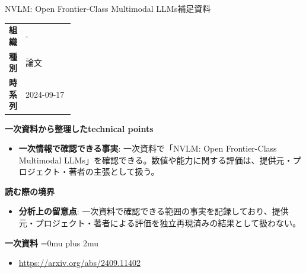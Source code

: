 \begin{technicalnote}{NVLM: Open Frontier-Class Multimodal LLMs}{補足資料}
\begingroup
\begin{tabularx}{\linewidth}{@{}>{\bfseries}p{0.22\linewidth}X@{}}
組織 & - \\
種別 & 論文 \\
時系列 & 2024-09-17 \\
\end{tabularx}
\smallskip
{\bfseries 一次資料から整理したtechnical points}
\begin{itemize}[leftmargin=1.5em,itemsep=0.35em]
\item \textbf{一次情報で確認できる事実}: 一次資料で「NVLM: Open Frontier-Class Multimodal LLMs」を確認できる。数値や能力に関する評価は、提供元・プロジェクト・著者の主張として扱う。
\end{itemize}
\begin{minipage}{\linewidth}
{\bfseries 読む際の境界}
\begin{itemize}[leftmargin=1.5em,itemsep=0.35em]
\item \textbf{分析上の留意点}: 一次資料で確認できる範囲の事実を記録しており、提供元・プロジェクト・著者による評価を独立再現済みの結果として扱わない。
\end{itemize}
\begin{samepage}
{\bfseries 一次資料}
\begingroup\sloppy
\Urlmuskip=0mu plus 2mu\relax
\begin{itemize}[leftmargin=1.5em,itemsep=0.25em]
\item {\scriptsize\url{https://arxiv.org/abs/2409.11402}}
\end{itemize}
\endgroup
\end{samepage}
\end{minipage}
\endgroup
\end{technicalnote}
\medskip

